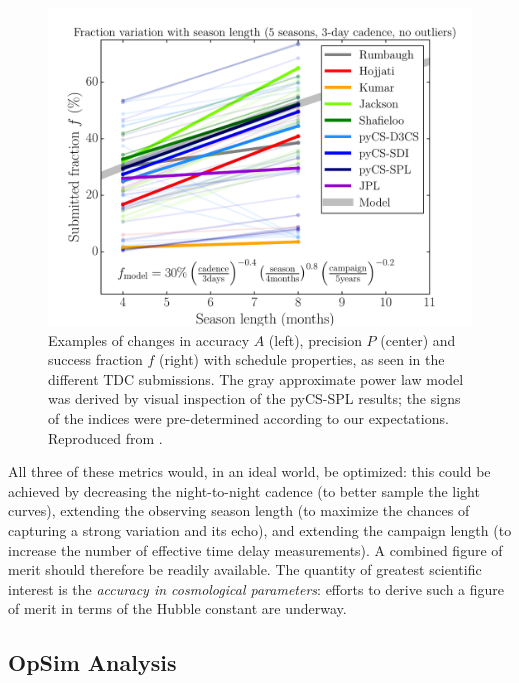 \begin{figure}[!ht]
\begin{minipage}[b]{\linewidth}
\begin{minipage}[b]{0.32\linewidth}
      \centering\includegraphics[width=\linewidth]{figs/Fraction_season_nca.pdf}
    \end{minipage}
  \end{minipage}
\caption{Examples of changes in accuracy $A$ (left), precision $P$ (center) and success fraction $f$ (right) with schedule properties, as seen in the different TDC submissions. The gray
approximate power law model was derived by visual inspection of the
pyCS-SPL results; the signs of the indices were pre-determined according to our expectations. Reproduced from \citet{LiaoEtal2015}.}
\label{fig:tdcresults}
\end{figure}

All three of these metrics would, in an ideal world, be optimized:
this could be achieved by decreasing the night-to-night cadence (to
better sample the light curves), extending the observing season length
(to maximize the chances of capturing a strong variation and its
echo), and extending the campaign length (to increase the number of
effective time delay measurements). A combined figure of merit should
therefore be readily available. The quantity of greatest scientific
interest is the {\it accuracy in cosmological parameters}: efforts to derive
such a figure of merit in terms of the Hubble constant are underway.


\subsection{OpSim Analysis}
\label{sec:\secname:analysis}

